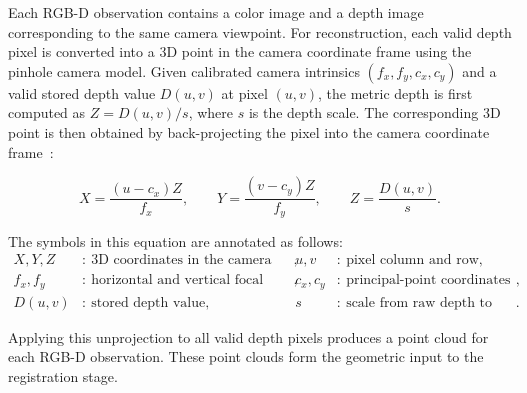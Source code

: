 \documentclass[11pt]{article}
\begin{document}

Each RGB-D observation contains a color image and a depth image corresponding to the same camera viewpoint. For reconstruction, each valid depth pixel is converted into a 3D point in the camera coordinate frame using the pinhole camera model. Given calibrated camera intrinsics $(f_x,f_y,c_x,c_y)$ and a valid stored depth value $D(u,v)$ at pixel $(u,v)$, the metric depth is first computed as $Z=D(u,v)/s$, where $s$ is the depth scale. The corresponding 3D point is then obtained by back-projecting the pixel into the camera coordinate frame~\cite{hartley2004multiple}:

\vspace{-0.5em}
\[
X=\frac{(u-c_x)Z}{f_x},\qquad
Y=\frac{(v-c_y)Z}{f_y},\qquad
Z=\frac{D(u,v)}{s}.
\]

The symbols in this equation are annotated as follows:
\[
\begin{aligned}
X,Y,Z &:\ \text{3D coordinates in the camera frame}, & u,v &:\ \text{pixel column and row},\\
f_x,f_y &:\ \text{horizontal and vertical focal lengths (pixels)}, & c_x,c_y &:\ \text{principal-point coordinates (pixels)},\\
D(u,v) &:\ \text{stored depth value}, & s &:\ \text{scale from raw depth to meters}.
\end{aligned}
\]

Applying this unprojection to all valid depth pixels produces a point cloud for each RGB-D observation. These point clouds form the geometric input to the registration stage.
\end{document}

